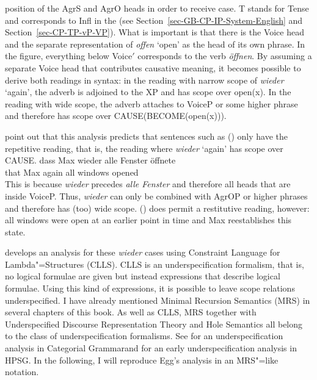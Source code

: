 position of the AgrS and AgrO heads in order to receive case.
T stands for Tense and corresponds to Infl in the \gbt (see
Section~\ref{sec-GB-CP-IP-System-English} and Section~\ref{sec-CP-TP-vP-VP}). 
What is important is that there is the Voice head and the separate representation of \emph{offen} `open' as the head of its
own phrase. In the figure, everything below Voice$'$ corresponds to the verb \emph{öffnen}. By assuming a separate Voice head that
contributes causative meaning, it becomes possible to derive both readings in syntax: in the reading with narrow scope of \emph{wieder} `again',
the adverb is adjoined to the XP and has scope over open(x). In the reading with wide scope, the adverb attaches to VoiceP or some higher phrase
and therefore has scope over CAUSE(BECOME(open(x))).

\citet{JB2003a-u} point out that this analysis predicts that sentences such as () only have the repetitive reading, that is, the reading where 
\emph{wieder} `again' has scope over CAUSE.
\ea
\label{ex-wieder-alle}
\gll dass Max wieder alle Fenster öffnete\\
     that Max again all windows opened\\
\z
This is because \emph{wieder} precedes \emph{alle Fenster} and therefore all heads that are inside VoiceP. Thus, \emph{wieder} can only
be combined with AgrOP or higher phrases and therefore has (too) wide scope. () does permit a restitutive reading, however:
all windows were open at an earlier point in time and Max reestablishes this state.

\citet{Egg99a} develops an analysis for these \emph{wieder} cases using Constraint
  Language for Lambda"=Structures (CLLS).
CLLS is an underspecification formalism, that is, no logical formulae are given but instead expressions that
describe logical formulae. Using this kind of expressions, it is possible to leave scope relations underspecified. I have already mentioned Minimal Recursion
Semantics (MRS)\indexmrs \citep*{CFPS2005a} in several chapters of this book. As well as CLLS, MRS
together with Underspecified Discourse Representation Theory
  \citep{Reyle93b-u,FR95a-u} and Hole Semantics \citep{Bos96a-u,BB2005a} all belong to the class
  of underspecification formalisms. See   for an underspecification analysis in Categorial Grammar\indexcg and 
 for an early underspecification analysis in HPSG\indexhpsg. In the following, I
will reproduce Egg's analysis in an MRS"=like notation.

